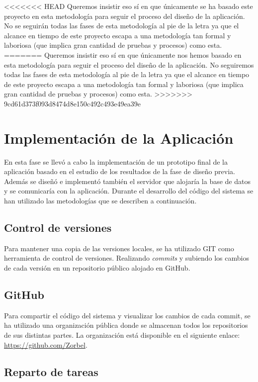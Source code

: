 <<<<<<< HEAD
Queremos insistir eso sí en que únicamente se ha basado este proyecto en esta metodología para seguir el proceso del diseño de la aplicación. No se seguirán todas las fases de esta metodología al pie de la letra ya que el alcance en tiempo de este proyecto escapa a una metodología tan formal y laboriosa (que implica gran cantidad de pruebas y procesos) como esta.
=======
Queremos insistir eso sí en que únicamente nos hemos basado en esta metodología para seguir el proceso del diseño de la aplicación. No seguiremos todas las fases de esta metodología al pie de la letra ya que el alcance en tiempo de este proyecto escapa a una metodología tan formal y laboriosa (que implica gran cantidad de pruebas y procesos) como esta.
>>>>>>> 9cd61d373f093d8474d8e150c492c493e49ea39e

\section{Implementación de la Aplicación}

En esta fase se llevó a cabo la implementación de un prototipo final de la aplicación basado en el estudio de los resultados de la fase de diseño previa. Además se diseñó e implementó también el servidor que alojaría la base de datos y se comunicaría con la aplicación. Durante el desarrollo del código del sistema se han utilizado las metodologías que se describen a continuación.

\subsection{Control de versiones}

Para mantener una copia de las versiones locales, se ha utilizado GIT como herramienta de control de versiones. Realizando \textit{commits} y subiendo los cambios de cada versión en un repositorio público alojado en GitHub.

\subsection{GitHub}

Para compartir el código del sistema y visualizar los cambios de cada commit, se ha utilizado una organización pública donde se almacenan todos los repositorios de sus distintas partes. La organización está disponible en el siguiente enlace: \url{https://github.com/Zorbel}.

\subsection{Reparto de tareas}

